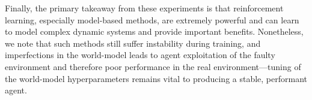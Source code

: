Finally, the primary takeaway from these experiments is that reinforcement learning, especially model-based methods, are extremely powerful and can learn to model complex dynamic systems and provide important benefits. Nonetheless, we note that such methods still suffer instability during training, and imperfections in the world-model leads to agent exploitation of the faulty environment and therefore poor performance in the real environment---tuning of the world-model hyperparameters remains vital to producing a stable, performant agent. 



